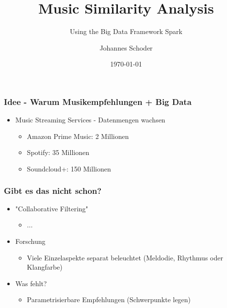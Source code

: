 \documentclass[12pt]{FSUBeamer_official}
\title[Music Similarity Analysis]{Music Similarity Analysis}
\subtitle{Using the Big Data Framework Spark}
\author[Schoder, Johannes]{Johannes Schoder}
\institute[FSU Jena]{Fakultät für Mathematik und Informatik\\
	Friedrich-Schiller-Universität Jena}
\date[WiSe 2019]{\today}
\begin{document}
\begin{frame}
 \titlepage
\end{frame}

\begin{frame}
\frametitle{Idee - Warum Musikempfehlungen + Big Data}
\begin{itemize}
 \item Music Streaming Services - Datenmengen wachsen
 \begin{itemize}
  \item Amazon Prime Music: 2 Millionen 
  \item Spotify: 35 Millionen
  \item Soundcloud+: 150 Millionen 
 \end{itemize}
\end{itemize}
\end{frame}

\begin{frame}
	\frametitle{Gibt es das nicht schon?}
	\begin{itemize}
		\item "Collaborative Filtering"
		\begin{itemize}
			\item ...
		\end{itemize}
		\item Forschung
		\begin{itemize}
			\item Viele Einzelaspekte separat beleuchtet (Meldodie, Rhythmus oder Klangfarbe)
		\end{itemize}
		\item Was fehlt?
		\begin{itemize}
			\item Parametrisierbare Empfehlungen (Schwerpunkte legen)
		\end{itemize}
	\end{itemize}
\end{frame}
\end{document}
